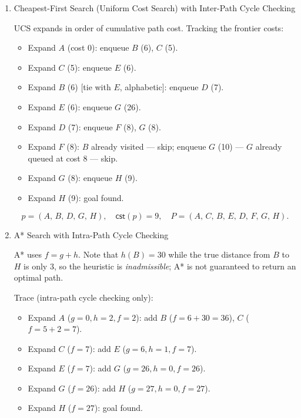 \begin{enumerate}
\begin{solution}
\[
p = (A,\,B,\,D,\,F,\,G,\,H),\quad \textsf{cst}(p) = 6+1+1+2+1 = 11,\quad P = (A,\,B,\,D,\,F,\,G,\,H).
\]
\end{solution}
\vspace{50pt}

\item \points[3] Cheapest-First Search (Uniform Cost Search) with Inter-Path Cycle Checking

\begin{solution}
UCS expands in order of cumulative path cost. Tracking the frontier costs:

\begin{itemize}
  \item Expand $A$ (cost 0): enqueue $B$ (6), $C$ (5).
  \item Expand $C$ (5): enqueue $E$ (6).
  \item Expand $B$ (6) [tie with $E$, alphabetic]: enqueue $D$ (7).
  \item Expand $E$ (6): enqueue $G$ (26).
  \item Expand $D$ (7): enqueue $F$ (8), $G$ (8).
  \item Expand $F$ (8): $B$ already visited --- skip; enqueue $G$ (10) --- $G$ already queued at cost 8 --- skip.
  \item Expand $G$ (8): enqueue $H$ (9).
  \item Expand $H$ (9): goal found.
\end{itemize}

\[
p = (A,\,B,\,D,\,G,\,H),\quad \textsf{cst}(p) = 9,\quad P = (A,\,C,\,B,\,E,\,D,\,F,\,G,\,H).
\]
\end{solution}
\vspace{50pt}

\item \points[3] A* Search with Intra-Path Cycle Checking

\begin{solution}
A* uses $f = g + h$. Note that $h(B) = 30$ while the true distance from $B$ to $H$ is only $3$, so the heuristic is \emph{inadmissible}; A* is not guaranteed to return an optimal path.

Trace (intra-path cycle checking only):
\begin{itemize}
  \item Expand $A$ ($g=0, h=2, f=2$): add $B$ ($f=6+30=36$), $C$ ($f=5+2=7$).
  \item Expand $C$ ($f=7$): add $E$ ($g=6, h=1, f=7$).
  \item Expand $E$ ($f=7$): add $G$ ($g=26, h=0, f=26$).
  \item Expand $G$ ($f=26$): add $H$ ($g=27, h=0, f=27$).
  \item Expand $H$ ($f=27$): goal found.
\end{itemize}


\end{solution}
\end{enumerate}
